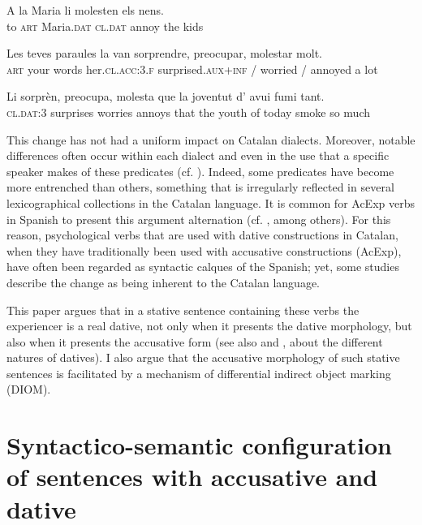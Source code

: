 \documentclass[output=paper,colorlinks,citecolor=brown,nonflat]{./langscibook}
\begin{document}
 \ex \label{ex:royo:1b}
 \gll A la Maria li molesten els nens.\\
 to \textsc{art} Maria.\textsc{dat} \textsc{cl.dat} annoy the kids\\
 \glt {}
 
 \z
 \z
 
\ea%
 \label{ex:royo:2} \citealt[77]{CabréMateu1998}
 \ea \label{ex:royo:2a}
 \gll Les teves paraules la van {sorprendre}, {preocupar}, {molestar} molt.\\
 \textsc{art} your words her.\textsc{cl.acc:3.f} surprised.\textsc{aux+inf} / worried / annoyed a lot\\
 \glt {}
 
 \ex \label{ex:royo:2b}
 \gll Li {sorprèn}, {preocupa}, {molesta} que la joventut d’ avui fumi tant.\\
 \textsc{cl.dat:3} surprises worries annoys that the youth of today smoke so much\\
 \glt {}
 
 \z
 \z
 

This change has not had a uniform impact on Catalan dialects. Moreover, notable differences often occur within each dialect and even in the use that a specific speaker makes of these predicates (cf. \citealt[70]{CabréMateu1998}). Indeed, some predicates have become more entrenched than others, something that is irregularly reflected in several lexicographical collections in the Catalan language. It is common for AcExp verbs in Spanish to present this argument alternation (cf. \citealt{MendivilGiro2005, MarínMcNally2011}, among others). For this reason, psychological verbs that are used with dative constructions in Catalan, when they have traditionally been used with accusative constructions (AcExp), have often been regarded as syntactic calques of the Spanish; yet, some studies describe the change as being inherent to the Catalan language.

This paper argues that in a stative sentence containing these verbs the experiencer is a real dative, not only when it presents the dative morphology, but also when it presents the accusative form (see also  and , about the different natures of datives). I also argue that the accusative morphology of such stative sentences is facilitated by a mechanism of differential indirect object marking (DIOM).

\section{Syntactico-semantic configuration of sentences with accusative and dative}\label{sec:royo:2}
\end{document}
